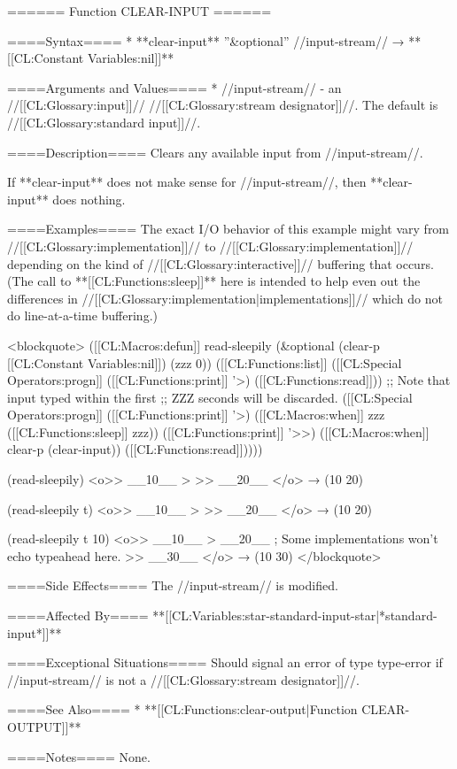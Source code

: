 ====== Function CLEAR-INPUT ======

====Syntax====
  * **clear-input** ''&optional'' //input-stream// → **[[CL:Constant Variables:nil]]**

====Arguments and Values====
  * //input-stream// - an //[[CL:Glossary:input]]// //[[CL:Glossary:stream designator]]//. The default is //[[CL:Glossary:standard input]]//.

====Description====
Clears any available input from //input-stream//.

If **clear-input** does not make sense for //input-stream//, then **clear-input** does nothing.

====Examples==== 
The exact I/O behavior of this example might vary from //[[CL:Glossary:implementation]]// to //[[CL:Glossary:implementation]]// depending on the kind of //[[CL:Glossary:interactive]]// buffering that occurs. (The call to **[[CL:Functions:sleep]]** here is intended to help even out the differences in //[[CL:Glossary:implementation|implementations]]// which do not do line-at-a-time buffering.)
 
<blockquote>
([[CL:Macros:defun]] read-sleepily (&optional (clear-p [[CL:Constant Variables:nil]]) (zzz 0))
  ([[CL:Functions:list]] ([[CL:Special Operators:progn]] ([[CL:Functions:print]] '>) 
               ([[CL:Functions:read]])) ;; Note that input typed within the first 
                       ;; ZZZ seconds will be discarded. 
        ([[CL:Special Operators:progn]] ([[CL:Functions:print]] '>) 
               ([[CL:Macros:when]] zzz ([[CL:Functions:sleep]] zzz)) 
               ([[CL:Functions:print]] '>>) 
               ([[CL:Macros:when]] clear-p (clear-input)) 
               ([[CL:Functions:read]]))))

(read-sleepily)
<o>> __10__
>
>> __20__ </o>
→ (10 20)

(read-sleepily t)
<o>> __10__
>
>> __20__ </o>
→ (10 20)

(read-sleepily t 10)
<o>> __10__
> __20__ ; Some implementations won't echo typeahead here.
>> __30__ </o>
→ (10 30) 
</blockquote>

====Side Effects====
The //input-stream// is modified.

====Affected By====
**[[CL:Variables:star-standard-input-star|*standard-input*]]**

====Exceptional Situations====
Should signal an error of type type-error if //input-stream// is not a //[[CL:Glossary:stream designator]]//.

====See Also====
  * **[[CL:Functions:clear-output|Function CLEAR-OUTPUT]]**

====Notes====
None.

